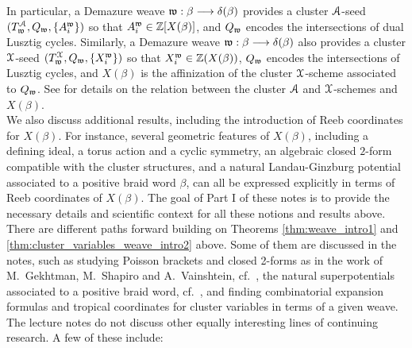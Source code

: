 In particular, a Demazure weave $\mathfrak{w}:\beta\longrightarrow\delta(\beta)$ provides a cluster $\mathcal{A}$-seed $(T^{\mathcal{A}}_{\mathfrak{w}},Q_{\mathfrak{w}},\{A_i^{\mathfrak{w}}\})$ so that $A_i^{\mathfrak{w}}\in\mathbb{Z}[X(\beta)]$, and $Q_{\mathfrak{w}}$ encodes the intersections of dual Lusztig cycles. Similarly, a Demazure weave $\mathfrak{w}:\beta\longrightarrow\delta(\beta)$ also provides a cluster $\mathcal{X}$-seed $(T^{\mathcal{X}}_{\mathfrak{w}},Q_{\mathfrak{w}},\{X_i^{\mathfrak{w}}\})$ so that $X_i^{\mathfrak{w}}\in\mathbb{Z}(X(\beta))$, $Q_{\mathfrak{w}}$ encodes the intersections of Lusztig cycles, and $X(\beta)$ is the affinization of the cluster $\mathcal{X}$-scheme associated to $Q_{\mathfrak{w}}$. See  for details on the relation between the cluster $\mathcal{A}$ and $\mathcal{X}$-schemes and $X(\beta)$.\\

\noindent We also discuss additional results, including the introduction of Reeb coordinates for $X(\beta)$. For instance, several geometric features of $X(\beta)$, including a defining ideal, a torus action and a cyclic symmetry, an algebraic closed $2$-form compatible with the cluster structures, and a natural Landau-Ginzburg potential associated to a positive braid word $\beta$, can all be expressed explicitly in terms of Reeb coordinates of $X(\beta)$. The goal of Part I of these notes is to provide the necessary details and scientific context for all these notions and results above.\\

 There are different paths forward building on Theorems \ref{thm:weave_intro1} and \ref{thm:cluster_variables_weave_intro2} above. Some of them are discussed in the notes, such as studying Poisson brackets and closed 2-forms as in the work of M.~Gekhtman, M.~Shapiro and A.~Vainshtein, cf.~\cite{GSV,GSV05}, the natural superpotentials associated to a positive braid word, cf.~, and finding combinatorial expansion formulas and tropical coordinates for cluster variables in terms of a given weave. The lecture notes do not discuss other equally interesting lines of continuing research. A few of these include:\\

